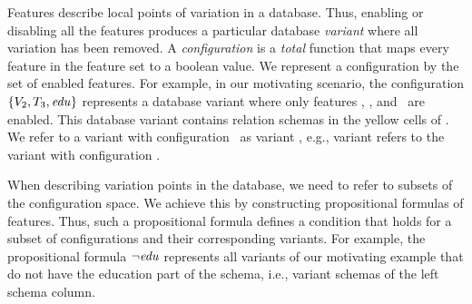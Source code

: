 Features describe local points of variation in a database.
Thus, enabling or disabling all
the features 
produces a particular database \emph{variant} where
all variation has been removed. 
A \emph{configuration} is a \emph{total} function
that maps every feature in the feature set to a boolean value.
We represent a configuration  by the set of enabled features.
For example, in our motivating scenario, the configuration \ensuremath{
\setDef {\vTwo,\tThree,\edu}
}
represents a database variant where only features \vTwo, \tThree, and \edu\ are enabled.
This database variant contains relation schemas in the yellow cells of .
We refer to a variant with configuration \config\ as variant \config, e.g.,
variant \setDef {\vTwo,\tThree,\edu} refers to the variant
with configuration \setDef {\vTwo,\tThree,\edu}.

When describing variation points in the database, we need to 
refer to subsets of the configuration space. We achieve this by 
constructing propositional formulas of features.
Thus, 
such a propositional formula defines a condition that holds for 
a subset of configurations and their corresponding variants. 
%
%
For example,
the propositional formula $\neg \edu$ represents all variants of our
motivating example that do not 
have the education part of the schema, i.e., variant schemas of the 
left schema column. 

